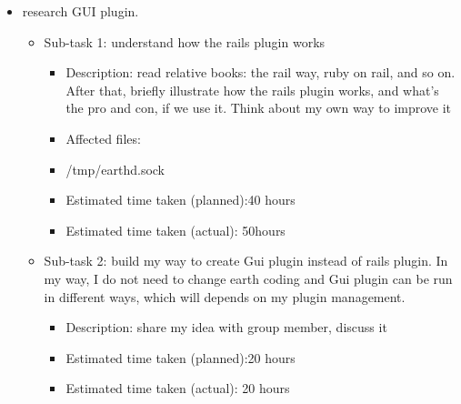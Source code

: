  \begin{itemize}
\item research GUI plugin.
	     \begin{itemize}
	         \item Sub-task 1: understand how the rails plugin works
	            \begin{itemize}
	              \item Description: read relative books: the rail way, ruby on rail, and so on. After that, briefly illustrate how the rails plugin works, and what's the pro and con, if we use it. Think about my own way to improve it
			   	       \item Affected files:\\
                                      \item /tmp/earthd.sock\\
				      \item Estimated time taken (planned):40 hours
				      \item Estimated time taken (actual): 50hours
	                  \end{itemize}
                          \end{itemize}
               \begin{itemize}
	         \item Sub-task 2: build my way to create Gui plugin instead of rails plugin. In my way, I do not need to change earth coding and Gui plugin can be run in different ways, which will depends on my plugin management.
	            \begin{itemize}
				  \item Description: share my idea with group member, discuss it
			          \item Estimated time taken (planned):20 hours
				  \item Estimated time taken (actual): 20 hours
                   \end{itemize}
                   \end{itemize}
  \end{itemize}

